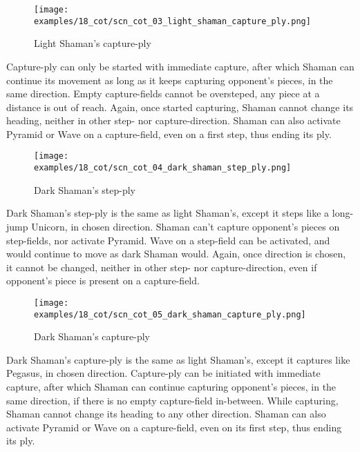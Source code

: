 \clearpage %

\noindent
\begin{figure}[!h]
\texttt{[image: examples/18\_cot/scn\_cot\_03\_light\_shaman\_capture\_ply.png]}
\caption{Light Shaman's capture-ply}
\label{fig:scn_cot_03_light_shaman_capture_ply}
\end{figure}

Capture-ply can only be started with immediate capture, after which Shaman
can continue its movement as long as it keeps capturing opponent's pieces,
in the same direction. Empty capture-fields cannot be oversteped, any piece
at a distance is out of reach. Again, once started capturing, Shaman cannot
change its heading, neither in other step- nor capture-direction. Shaman
can also activate Pyramid or Wave on a capture-field, even on a first step,
thus ending its ply.

\clearpage %

\noindent
\begin{figure}[!h]
\texttt{[image: examples/18\_cot/scn\_cot\_04\_dark\_shaman\_step\_ply.png]}
\caption{Dark Shaman's step-ply}
\label{fig:scn_cot_04_dark_shaman_step_ply}
\end{figure}

Dark Shaman's step-ply is the same as light Shaman's, except it steps like a
long-jump Unicorn, in chosen direction. Shaman can't capture opponent's pieces
on step-fields, nor activate Pyramid. Wave on a step-field can be activated,
and would continue to move as dark Shaman would. Again, once direction is
chosen, it cannot be changed, neither in other step- nor capture-direction,
even if opponent's piece is present on a capture-field.

\clearpage %

\noindent
\begin{figure}[!h]
\texttt{[image: examples/18\_cot/scn\_cot\_05\_dark\_shaman\_capture\_ply.png]}
\caption{Dark Shaman's capture-ply}
\label{fig:scn_cot_05_dark_shaman_capture_ply}
\end{figure}

Dark Shaman's capture-ply is the same as light Shaman's, except it captures like
Pegasus, in chosen direction. Capture-ply can be initiated with immediate capture,
after which Shaman can continue capturing opponent's pieces, in the same direction,
if there is no empty capture-field in-between. While capturing, Shaman cannot change
its heading to any other direction. Shaman can also activate Pyramid or Wave on a
capture-field, even on its first step, thus ending its ply.

